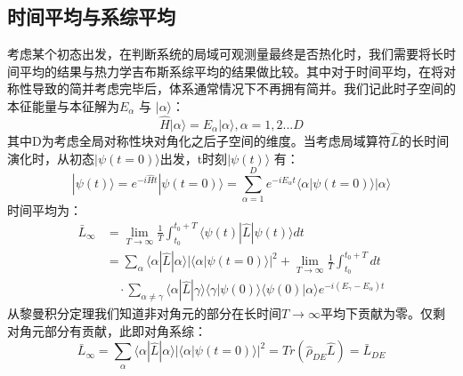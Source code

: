 \subsection{时间平均与系综平均}
考虑某个初态出发，在判断系统的局域可观测量最终是否热化时，我们需要将长时间平均的结果与热力学吉布斯系综平均的结果做比较。其中对于时间平均，在将对称性导致的简并考虑完毕后，体系通常情况下不再拥有简并。我们记此时子空间的本征能量与本征解为$E_\alpha$ 与 $|\alpha\rangle$：
\begin{equation}
\hat{H} |\alpha\rangle = E_\alpha |\alpha\rangle, \alpha=1,2...D
\end{equation}
其中D为考虑全局对称性块对角化之后子空间的维度。当考虑局域算符$\hat{L}$的长时间演化时，从初态$|\psi(t=0)\rangle$出发，t时刻$|\psi(t)\rangle$ 有：
\begin{equation}
|\psi(t)\rangle = e^{-i\hat{H}t}|\psi(t=0)\rangle = \sum_{\alpha=1}^D e^{-i E_\alpha t} \langle\alpha|\psi(t=0) \rangle  |\alpha\rangle
\end{equation}
时间平均为：
\begin{equation}
\begin{split}
	\bar{L}_{\infty}  &= \lim_{T\to \infty} \frac{1}{T} \int_{t_0}^{t_0+T} \langle\psi(t)|\hat{L}|\psi(t)\rangle dt \\
		\quad &=  \sum_{\alpha} \langle\alpha|\hat{L}|\alpha\rangle |\langle\alpha|\psi(t=0)\rangle|^2  +  \lim_{T\to \infty} \frac{1}{T} \int_{t_0}^{t_0+T} dt \\
		&\quad \cdot\sum_{\alpha\neq\gamma} \langle\alpha|\hat{L}|\gamma\rangle \langle\gamma|\psi(0)\rangle \langle\psi(0)|\alpha\rangle e^{-i(E_\gamma-E_\alpha)t}
\end{split}
\end{equation}
从黎曼积分定理我们知道非对角元的部分在长时间$T\to\infty$平均下贡献为零。仅剩对角元部分有贡献，此即对角系综：
\begin{equation}
	\bar{L}_{\infty} =  \sum_{\alpha} \langle\alpha|\hat{L}|\alpha\rangle |\langle\alpha|\psi(t=0)\rangle|^2  = Tr(\hat{\rho}_{DE}\hat{L}) = \bar{L}_{DE}
\end{equation}

